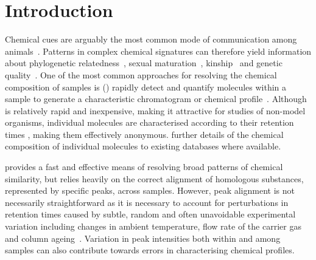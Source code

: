 \documentclass[10pt,letterpaper]{article}
\begin{document}
\section*{Introduction}
Chemical cues are arguably the most common mode of communication among animals~\cite{Wyatt.2014}. Patterns in complex chemical signatures can therefore yield information about phylogenetic relatedness~\cite{Meulemeester.2011}, sexual maturation~\cite{Caspers.2011}, kinship~\cite{Bonadonna.2012, Krause.2012, Stoffel.2015} and genetic quality~\cite{Charpentier.2010, Leclaire.2012, Stoffel.2015}. One of the most common approaches for resolving the chemical composition of samples is   ()   rapidly detect and quantify molecules within a sample to generate a characteristic  chromatogram or chemical profile~\cite{McNair.2011}. 
Although  is relatively rapid and inexpensive, making it attractive for studies of non-model organisms, individual molecules are characterised according to their retention times , making them effectively anonymous.    further details of the chemical composition of individual molecules   to existing databases where available.\par
{} provides a fast and effective means of resolving broad patterns of chemical similarity, but relies heavily on the correct alignment of homologous substances, represented by specific peaks, across samples. However, peak alignment is not necessarily straightforward as it is necessary to account for perturbations in retention times caused by subtle, random and often unavoidable experimental variation including changes in ambient temperature, flow rate of the carrier gas and column ageing~\cite{Scott.2003, Pierce.2005}.  Variation in peak intensities both within and among samples can also contribute towards errors in characterising chemical profiles. \par
\end{document}
